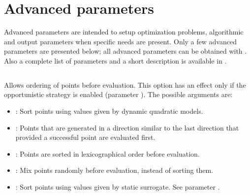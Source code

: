 \documentclass[letterpaper,10pt,english]{sphinxmanual}
\begin{document}
\section{Advanced parameters}
\label{\detokenize{AdvancedFunctionalities:advanced-parameters}}
\sphinxAtStartPar
Advanced parameters are intended to setup optimization problems, algorithmic and output parameters when specific needs are present.
Only a few advanced parameters are presented below; all advanced parameters can be obtained with .
Also a complete list of parameters and a short description is available in {\hyperref[\detokenize{Appendix:appendix-parameters}]{}}.


\subsection{}
\label{\detokenize{AdvancedFunctionalities:eval-queue-sort}}\label{\detokenize{AdvancedFunctionalities:id2}}
\sphinxAtStartPar
Allows ordering of points before evaluation. This option has an effect only if the opportunistic strategy is enabled (parameter {\hyperref[\detokenize{AdvancedFunctionalities:eval-opportunistic}]{}}). The possible arguments are:
\begin{itemize}
\item {} 
\sphinxAtStartPar
{}: Sort points using values given by dynamic quadratic models.

\item {} 
\sphinxAtStartPar
{}: Points that are generated in a direction similar to the last direction that provided a successful point are evaluated first.

\item {} 
\sphinxAtStartPar
{}: Points are sorted in lexicographical order before evaluation.

\item {} 
\sphinxAtStartPar
{}: Mix points randomly before evaluation, instead of sorting them.

\item {} 
\sphinxAtStartPar
{}: Sort points using values given by static surrogate. See parameter {\hyperref[\detokenize{AdvancedFunctionalities:surrogate-exe}]{}}.

\end{itemize}
\end{document}
